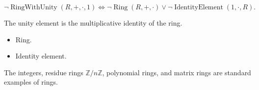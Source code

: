 \begin{remark*}
\[
\neg\operatorname{RingWithUnity}(R,+,\cdot,1)
\Longleftrightarrow
\neg\operatorname{Ring}(R,+,\cdot)
\lor
\neg\operatorname{IdentityElement}(1,\cdot,R).
\]
\end{remark*}

\begin{remark*}[Interpretation]
The unity element is the multiplicative identity of the ring.
\end{remark*}

\begin{remark*}[Dependencies]
\begin{itemize}
  \item Ring.
  \item Identity element.
\end{itemize}
\end{remark*}

\begin{remark*}[Examples]
The integers, residue rings $\mathbb{Z}/n\mathbb{Z}$, polynomial rings, and
matrix rings are standard examples of rings.
\end{remark*}
